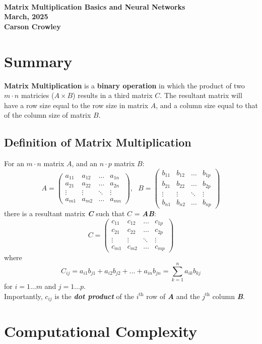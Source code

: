 \documentclass{article}
\begin{document}
 

\begin{center}
	\text{} 
	\\[22em] 
	{\LARGE \textbf{Matrix Multiplication Basics and Neural Networks}} \\[1em] 
	{\large \textbf{March, 2025}} \\[0.5em] 
	{\small \textbf{Carson Crowley}} 
\end{center} 

\thispagestyle{empty} 
\newpage
\section{Summary} 
\textbf{Matrix Multiplication} is a \textbf{binary operation} in which the product of two \(m\cdot n\) matricies (\(A\times B\)) results in a third matrix \(C\). The resultant matrix will have a row size equal to the row size in matrix \(A\), and a column size equal to that of the column size of matrix \(B\).     
\subsection{Definition of Matrix Multiplication}
For an \(m\cdot n\) matrix \(A\), and an \(n\cdot p\) matrix \(B\): 
\begin{equation}
	A = \begin{pmatrix} a_{11} & a_{12} & \hdots & a_{1n} \\ 
			    a_{21} & a_{22} & \hdots & a_{2n} \\
			    \vdots & \vdots & \ddots & \vdots \\ 
			    a_{m1} & a_{m2} & \hdots & a_{mn} 
	\end{pmatrix},\text{ } 
	B = \begin{pmatrix} b_{11} & b_{12} & \hdots & b_{1p} \\
	 		    b_{21} & b_{22} & \hdots & b_{2p} \\ 
			    \vdots & \vdots & \ddots & \vdots \\ 
			    b_{n1} & b_{n2} & \hdots & b_{np} 
	\end{pmatrix}
\end{equation} 
there is a resultant matrix \textbf{\textit{C}} such that \(C\) = \textbf{\textit{AB}}: 
\begin{equation}
	C = \begin{pmatrix} c_{11} & c_{12} & \hdots & c_{1p} \\
			    c_{21} & c_{22} & \hdots & c_{2p} \\ 
			    \vdots & \vdots & \ddots & \vdots \\ 
		  	    c_{m1} & c_{m2} & \hdots & c_{mp} 
	\end{pmatrix} 
\end{equation} 
where
\[C_{ij} = a_{i1}b_{j1} + a_{i2}b_{j2} + \hdots + a_{in}b_{jn} = \sum_{k=1}^{n}a_{ik}b_{kj}\]
for \(i = 1 \hdots m\) and \(j = 1 \hdots p\). \\[0.5em] 
Importantly, \(c_{ij}\) is the \textbf{\textit{dot product}} of the \(i^{\text{th}}\) row of \textbf{\textit{A}} and the \(j^{\text{th}}\) column \textbf{\textit{B}}. 
		


\section{Computational Complexity} 
\end{document}
